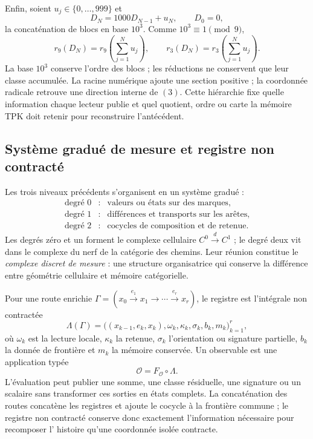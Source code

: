 Enfin, soient \(u_j\in\{0,\ldots,999\}\) et
\[
 D_N=1000D_{N-1}+u_N,
 \qquad D_0=0,
\]
la concaténation de blocs en base \(10^3\). Comme \(10^3\equiv1\pmod9\),
\begin{equation}
 r_9(D_N)=r_9\!\left(\sum_{j=1}^{N}u_j\right),
 \qquad
 r_3(D_N)=r_3\!\left(\sum_{j=1}^{N}u_j\right).
 \label{eq:compatibilidad-base-mil-reducciones-rev3}
\end{equation}
La base \(10^3\) conserve l'ordre des blocs ; les réductions ne conservent que
leur classe accumulée. La racine numérique ajoute une section positive ; la coordonnée
radicale retrouve une direction interne de \((3)\). Cette hiérarchie fixe quelle
information chaque lecteur publie et quel quotient, ordre ou carte la
mémoire TPK doit retenir pour reconstruire l'antécédent.

\subsection{Système gradué de mesure et registre non contracté}

Les trois niveaux précédents s'organisent en un système gradué :
\[
 \boxed{
 \begin{array}{ccl}
 \text{degré }0&:&\text{valeurs ou états sur des marques},\\
 \text{degré }1&:&\text{différences et transports sur les arêtes},\\
 \text{degré }2&:&\text{cocycles de composition et de retenue}.
 \end{array}}
\]
Les degrés zéro et un forment le complexe cellulaire
\(C^0\xrightarrow d C^1\) ; le degré deux vit dans le complexe du nerf de la
catégorie des chemins. Leur réunion constitue le \emph{complexe discret de
mesure} : une structure organisatrice qui conserve la différence entre
géométrie cellulaire et mémoire catégorielle.

Pour une route enrichie
\(\Gamma=(x_0\xrightarrow{e_1}x_1\to\cdots\xrightarrow{e_r}x_r)\), le
registre est l'intégrale non contractée
\begin{equation}
 \Lambda(\Gamma)
 =\bigl((x_{k-1},e_k,x_k),\omega_k,\kappa_k,\sigma_k,b_k,m_k\bigr)_{k=1}^{r},
 \label{eq:ledger-integral-no-contraida-rev2}
\end{equation}
où \(\omega_k\) est la lecture locale, \(\kappa_k\) la retenue, \(\sigma_k\)
l'orientation ou signature partielle, \(b_k\) la donnée de frontière et \(m_k\) la
mémoire conservée. Un observable est une application typée
\[
 \mathcal O=F_{\mathcal O}\circ\Lambda.
\]
L'évaluation peut publier une somme, une classe résiduelle, une signature ou un
scalaire sans transformer ces sorties en états complets. La concaténation des
routes concatène les registres et ajoute le cocycle à la frontière commune ; le
registre non contracté conserve donc exactement l'information nécessaire pour recomposer l'
histoire qu'une coordonnée isolée contracte.

